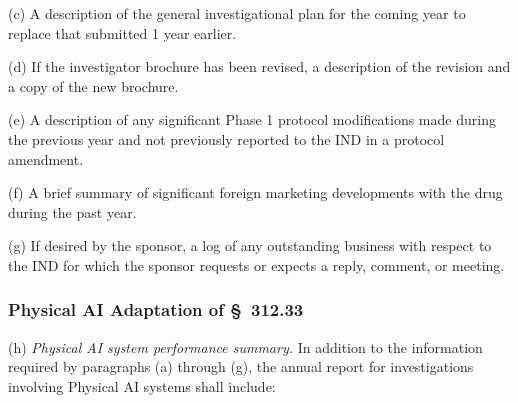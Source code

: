 \documentclass[11pt]{article}
\begin{document}
(c) A description of the general investigational plan for the coming year to replace that submitted 1 year earlier.

(d) If the investigator brochure has been revised, a description of the revision and a copy of the new brochure.

(e) A description of any significant Phase 1 protocol modifications made during the previous year and not previously reported to the IND in a protocol amendment.

(f) A brief summary of significant foreign marketing developments with the drug during the past year.

(g) If desired by the sponsor, a log of any outstanding business with respect to the IND for which the sponsor requests or expects a reply, comment, or meeting.

\subsubsection{Physical AI Adaptation of \S~312.33}

(h) \textit{Physical AI system performance summary.} In addition to the information required by paragraphs (a) through (g), the annual report for investigations involving Physical AI systems shall include:
\end{document}
